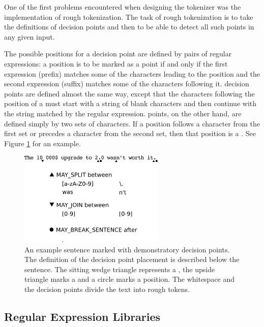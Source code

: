 One of the first problems encountered when designing the tokenizer was the
implementation of rough tokenization. The task of rough tokenization is to take
the definitions of decision points and then to be able to detect all such points
in any given input.

The possible positions for a \maysplit{} decision point are defined by pairs of
regular expressions: a position is to be marked as a \maysplit{} point if and
only if the first expression (prefix) matches some of the characters
leading to the position and the second expression (suffix) matches some of
the characters following it. \mayjoin{} decision points are defined almost the
same way, except that the characters following the position of a \mayjoin{}
must start with a string of blank characters and then continue with the string
matched by the regular expression. \maybreaksentence{} points, on the other
hand, are defined simply by two sets of characters. If a position follows a
character from the first set or precedes a character from the second set, then
that position is a \maybreaksentence{}. See Figure \ref{fig:decision-points} for an example.

\begin{figure}
  \includegraphics[width=0.618033988\textwidth]{img/decisionpoints.eps}
  \caption{An example sentence marked with demonstratory decision points. The
           definition of the decision point placement is described below the
           sentence. The sitting wedge triangle represents a \maysplit{}, the
           upside triangle marks a \mayjoin{} and a circle marks a
           \maybreaksentence{} position. The whitespace and the decision
           points divide the text into rough tokens.}
  \label{fig:decision-points}
\end{figure}


\subsection{Regular Expression Libraries}
\label{ssec:impl-roughtok-regex}

